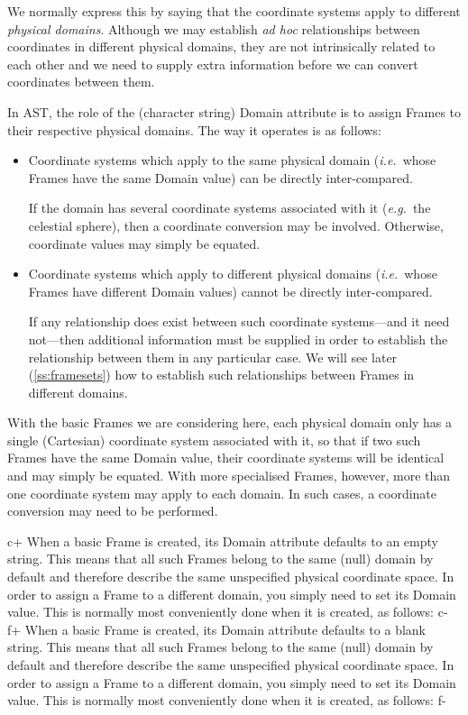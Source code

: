 \documentclass[twoside,11pt]{article}
\newcommand{\secref}[1]{\S\ref{#1}}
\renewcommand{\secref}[1]{\ref{#1}}
\begin{document}
We normally express this by saying that the coordinate systems apply
to different {\em{physical domains}}. Although we may establish
{\em{ad hoc}} relationships between coordinates in different physical
domains, they are not intrinsically related to each other and we need
to supply extra information before we can convert coordinates between
them.

In AST, the role of the (character string) Domain attribute is to
assign Frames to their respective physical domains. The way it
operates is as follows:

\begin{itemize}
\item Coordinate systems which apply to the same physical domain
({\em{i.e.}}\ whose Frames have the same Domain value) can be directly
inter-compared.

If the domain has several coordinate systems associated with it
({\em{e.g.}}\ the celestial sphere), then a coordinate conversion may
be involved. Otherwise, coordinate values may simply be equated.

\item Coordinate systems which apply to different physical domains
({\em{i.e.}}\ whose Frames have different Domain values) cannot be
directly inter-compared.

If any relationship does exist between such coordinate systems---and
it need not---then additional information must be supplied in order to
establish the relationship between them in any particular case. We
will see later (\secref{ss:framesets}) how to establish such
relationships between Frames in different domains.
\end{itemize}

With the basic Frames we are considering here, each physical domain only
has a single (Cartesian) coordinate system associated with it, so that if
two such Frames have the same Domain value, their coordinate systems will
be identical and may simply be equated. With more specialised Frames,
however, more than one coordinate system may apply to each domain. In
such cases, a coordinate conversion may need to be performed.

c+
When a basic Frame is created, its Domain attribute defaults to an
empty string. This means that all such Frames belong to the same
(null) domain by default and therefore describe the same unspecified
physical coordinate space. In order to assign a Frame to a different
domain, you simply need to set its Domain value. This is normally most
conveniently done when it is created, as follows:
c-
f+
When a basic Frame is created, its Domain attribute defaults to a
blank string. This means that all such Frames belong to the same
(null) domain by default and therefore describe the same unspecified
physical coordinate space. In order to assign a Frame to a different
domain, you simply need to set its Domain value. This is normally most
conveniently done when it is created, as follows:
f-
\end{document}
